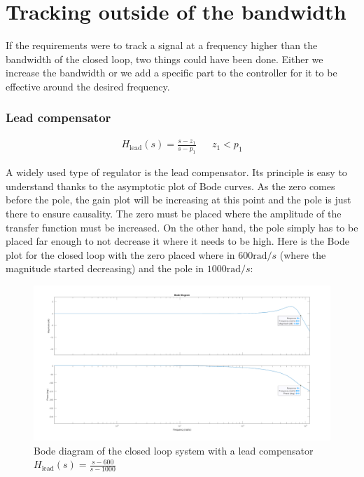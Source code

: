 \appendix
\renewcommand{\thechapter}{\Alph{chapter}}


\chapter{Tracking outside of the bandwidth}
\label{annex:tracking}

If the requirements were to track a signal at a frequency higher than the bandwidth of the closed loop, two things could 
have been done. Either we increase the bandwidth or we add a specific part to the controller for it to be effective 
around the desired frequency.

\subsection{Lead compensator}

\begin{align}
    H_{\text{lead}}(s) = \frac{s - z_1}{s - p_1} && z_1 < p_1
\end{align}

A widely used type of regulator is the lead compensator. Its principle is easy to understand thanks to the asymptotic
plot of Bode curves. As the zero comes before the pole, the gain plot will be increasing at this point and the pole is 
just there to ensure causality. The zero must be placed where the amplitude of the transfer function must be increased. 
On the other hand, the pole simply has to be placed far enough to not decrease it where it needs to be high. Here is the 
Bode plot for the closed loop with the zero placed where in $600 \text{rad}/s$ (where the magnitude started decreasing) 
and the pole in $1000 \text{rad}/s$:

\begin{figure}[H]
    \centering
    \includegraphics[height=\textheight/3]{Pictures/annex_lead_comp.png}
    \caption{Bode diagram of the closed loop system with a lead compensator $H_{\text{lead}}(s) = \frac{s-600}{s-1000}$}
\end{figure}


